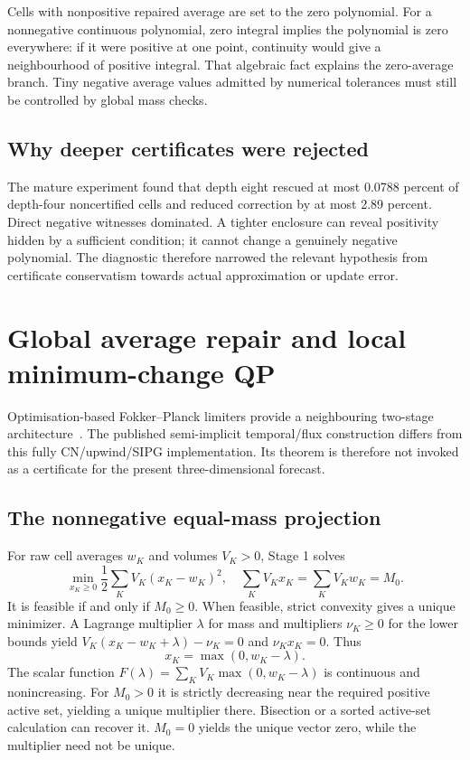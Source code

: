 Cells with nonpositive repaired average are set to the zero polynomial. For a nonnegative continuous polynomial, zero integral implies the polynomial is zero everywhere: if it were positive at one point, continuity would give a neighbourhood of positive integral. That algebraic fact explains the zero-average branch. Tiny negative average values admitted by numerical tolerances must still be controlled by global mass checks.

\section{Why deeper certificates were rejected}
The mature experiment found that depth eight rescued at most 0.0788 percent of depth-four noncertified cells and reduced correction by at most 2.89 percent. Direct negative witnesses dominated. A tighter enclosure can reveal positivity hidden by a sufficient condition; it cannot change a genuinely negative polynomial. The diagnostic therefore narrowed the relevant hypothesis from certificate conservatism towards actual approximation or update error.


\chapter{Global average repair and local minimum-change QP}\label{ch:qp}
Optimisation-based Fokker--Planck limiters provide a neighbouring two-stage architecture~\cite{liuhu}. The published semi-implicit temporal/flux construction differs from this fully CN/upwind/SIPG implementation. Its theorem is therefore not invoked as a certificate for the present three-dimensional forecast.
\section{The nonnegative equal-mass projection}
For raw cell averages $w_K$ and volumes $V_K>0$, Stage 1 solves
\begin{equation}\label{eq:stage1}
\min_{x_K\ge0}\frac12\sum_KV_K(x_K-w_K)^2,
\quad\sum_KV_Kx_K=\sum_KV_Kw_K=M_0.
\end{equation}
It is feasible if and only if $M_0\ge0$. When feasible, strict convexity gives a unique minimizer. A Lagrange multiplier $\lambda$ for mass and multipliers $\nu_K\ge0$ for the lower bounds yield $V_K(x_K-w_K+\lambda)-\nu_K=0$ and $\nu_Kx_K=0$. Thus
\begin{equation}\label{eq:waterfill}
x_K=\max(0,w_K-\lambda).
\end{equation}
The scalar function $F(\lambda)=\sum_KV_K\max(0,w_K-\lambda)$ is continuous and nonincreasing. For $M_0>0$ it is strictly decreasing near the required positive active set, yielding a unique multiplier there. Bisection or a sorted active-set calculation can recover it. $M_0=0$ yields the unique vector zero, while the multiplier need not be unique.

